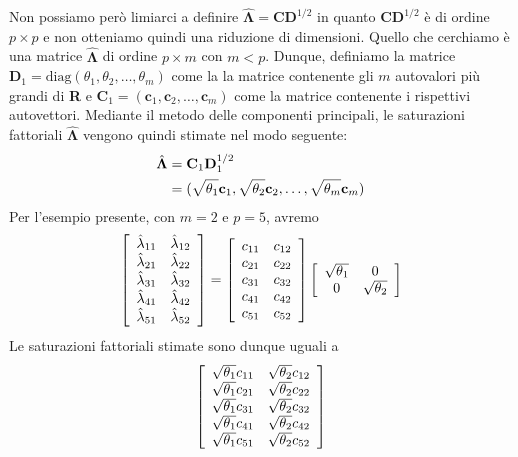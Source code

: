 Non possiamo però limiarci a definire
    $\hat{\boldsymbol{\Lambda}}=\textbf{C}\textbf{D}^{1/2}$ in quanto
    $\textbf{C}\textbf{D}^{1/2}$ è di ordine $p \times p$ e non
    otteniamo quindi una riduzione di dimensioni.
  Quello che cerchiamo è  una matrice $\hat{\boldsymbol{\Lambda}}$ di ordine $p \times m$ con $m < p$. 
Dunque, definiamo 
 la matrice $\textbf{D}_1= \text{diag}(\theta_1,
\theta_2, \dots, \theta_m)$ come la la matrice contenente gli $m$
autovalori più grandi di \textbf{R} e 
 $\textbf{C}_1=( \textbf{c}_1,
\textbf{c}_2, \dots,  \textbf{c}_m)$ come la matrice  contenente i
rispettivi autovettori.
Mediante il metodo delle componenti principali, le saturazioni fattoriali $\hat{\boldsymbol{\Lambda}}$ vengono quindi stimate nel modo seguente:
\begin{align}
\hat{\boldsymbol{\Lambda}} &= \textbf{C}_1 \textbf{D}_1^{1/2}\notag\\
&= (\sqrt{\theta_1} \textbf{c}_1, \sqrt{\theta_2} \textbf{c}_2, 
\dots, \sqrt{\theta_m} \textbf{c}_m) 
\end{align}
Per l'esempio presente, con $m=2$ e $p=5$, avremo
\begin{equation}
\left[
  \begin{array}{ c c }
 \hat{\lambda}_{11} & \hat{\lambda}_{12} \\
 \hat{\lambda}_{21} & \hat{\lambda}_{22} \\
 \hat{\lambda}_{31} & \hat{\lambda}_{32} \\
 \hat{\lambda}_{41} & \hat{\lambda}_{42} \\
 \hat{\lambda}_{51} & \hat{\lambda}_{52} 
  \end{array} 
\right] =
\left[
  \begin{array}{ c c }
 c_{11} & c_{12} \\
 c_{21} & c_{22} \\
 c_{31} & c_{32} \\
 c_{41} & c_{42} \\
 c_{51} & c_{52} 
  \end{array} 
\right]
\left[
  \begin{array}{ c c }
 \sqrt{\theta_1} & 0\\
 0 &\sqrt{\theta_2} 
  \end{array} 
\right]
\end{equation}
Le saturazioni fattoriali stimate sono dunque uguali a
\begin{equation}
\left[
  \begin{array}{ c c }
 \sqrt{\theta_1}c_{11} & \sqrt{\theta_2}c_{12} \\
 \sqrt{\theta_1}c_{21} & \sqrt{\theta_2}c_{22} \\
 \sqrt{\theta_1}c_{31} & \sqrt{\theta_2}c_{32} \\
 \sqrt{\theta_1}c_{41} & \sqrt{\theta_2}c_{42} \\
 \sqrt{\theta_1}c_{51} & \sqrt{\theta_2}c_{52} 
  \end{array} 
\right]
\end{equation}
